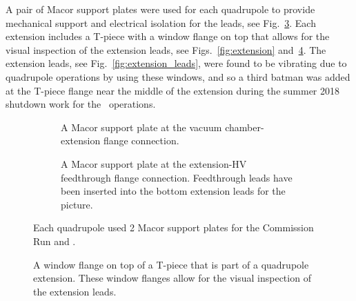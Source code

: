 A pair of Macor support plates were used for each quadrupole to provide mechanical support and electrical isolation for the leads, see Fig.~\ref{fig:two_batmen}. Each extension includes a T-piece with a window flange on top that allows for the visual inspection of the extension leads, see Figs.~\ref{fig:extension} and~\ref{fig:window}. The extension leads, see Fig.~\ref{fig:extension_leads}, were found to be vibrating due to quadrupole operations by using these windows, and so a third batman was added at the T-piece flange near the middle of the extension during the summer 2018 shutdown work for the \runtwo~operations.

\begin{figure}[]
	\centering
	\begin{subfigure}{\columnwidth}
		\caption{A Macor support plate at the vacuum chamber-extension flange connection.}\label{fig:chamber_batman}
	\end{subfigure}
	\begin{subfigure}{\columnwidth}
		\caption{A Macor support plate at the extension-HV feedthrough flange connection. Feedthrough leads have been inserted into the bottom extension leads for the picture.}\label{fig:extension_batman}
	\end{subfigure}
	\caption{Each quadrupole used 2 Macor support plates for the Commission Run and \runone.}\label{fig:two_batmen}
\end{figure}

\begin{figure}[]
	\centering
	\caption{A window flange on top of a T-piece that is part of a quadrupole extension. These window flanges allow for the visual inspection of the extension leads.}\label{fig:window}
\end{figure}

